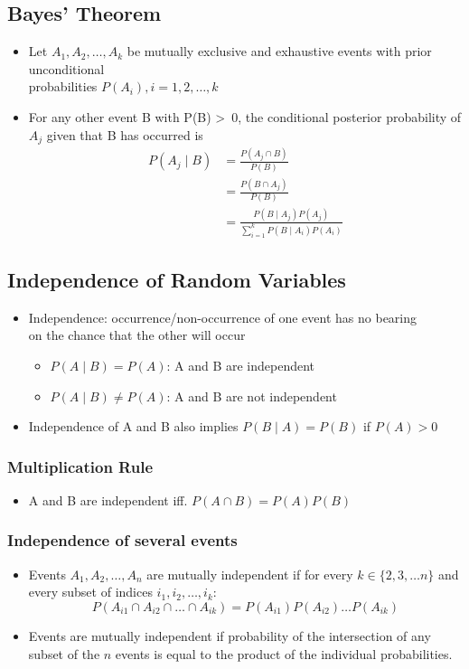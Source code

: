 \documentclass[a4paper]{article}
\begin{document}
\subsection{Bayes' Theorem}
\begin{itemize}
    \item Let $A_{1}, A_{2}, \ldots, A_{k}$ be mutually exclusive and exhaustive events with prior unconditional \\probabilities $P(A_{i}), i = 1, 2, \ldots, k$
    \item For any other event B with P(B) \textgreater \  0, the conditional posterior probability of $A_{j}$ given that B has occurred is 
    \begin{align*}
        P(A_{j}\mid B) &= \frac{P(A_{j}\cap B)}{P(B)}\\
        &= \frac{P(B\cap A_{j})}{P(B)}\\
        &= \frac{P(B\mid A_{j})P(A_{j})}{\sum_{i=1}^{k}P(B\mid A_{i})P(A_{i})}
    \end{align*}
\end{itemize}
\subsection{Independence of Random Variables}
\begin{itemize}
    \item Independence: occurrence/non-occurrence of one event has no bearing\\ on the chance that the other will occur
    \begin{itemize}[label=$\circ$]
        \item $P(A\mid B) = P(A)$: A and B are independent
        \item $P(A\mid B) \neq P(A)$: A and B are not independent
    \end{itemize}
    \item Independence of A and B also implies $P(B\mid A) = P(B)$ if $P(A) > 0$
\end{itemize}
\subsubsection{Multiplication Rule}
\begin{itemize}
    \item A and B are independent iff. $P(A\cap B) = P(A)P(B)$
\end{itemize}
\subsubsection{Independence of several events}
\begin{itemize}
    \item Events $A_{1}, A_{2}, \ldots, A_{n}$ are mutually independent if for every $k \in \{2, 3, \ldots n\}$ and every subset of indices $i_{1}, i_{2}, \ldots, i_{k}$:
    $$P(A_{i1}\cap A_{i2}\cap\ldots\cap A_{ik}) = P(A_{i1})P(A_{i2})\ldots P(A_{ik})$$
    \item Events are mutually independent if probability of the intersection of any subset of the $n$ events is equal to the product of the individual probabilities.
\end{itemize}
\end{document}
